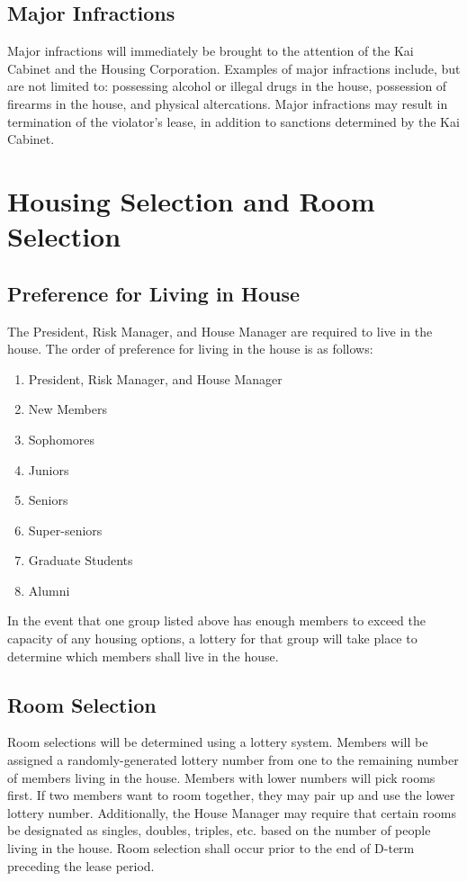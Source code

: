 \subsection{Major Infractions}

Major infractions will immediately be brought to the attention of the Kai
Cabinet and the Housing Corporation.
Examples of major infractions include, but are not limited to: possessing
alcohol or illegal drugs in the house, possession of firearms in the house, and
physical altercations.
Major infractions may result in termination of the violator’s lease, in
addition to sanctions determined by the Kai Cabinet.

\section{Housing Selection and Room Selection}

\subsection{Preference for Living in House}

The President, Risk Manager, and House Manager are required to live in the
house.
The order of preference for living in the house is as follows:
\begin{enumerate}
    \item President, Risk Manager, and House Manager
    \item New Members
    \item Sophomores
    \item Juniors
    \item Seniors
    \item Super-seniors
    \item Graduate Students
    \item Alumni
\end{enumerate}

In the event that one group listed above has enough members to exceed the
capacity of any housing options, a lottery for that group will take place to
determine which members shall live in the house.

\subsection{Room Selection}

Room selections will be determined using a lottery system.
Members will be assigned a randomly-generated lottery number from one to the
remaining number of members living in the house.
Members with lower numbers will pick rooms first.
If two members want to room together, they may pair up and use the lower
lottery number.
Additionally, the House Manager may require that certain rooms be designated as
singles, doubles, triples, etc.
based on the number of people living in the house.
Room selection shall occur prior to the end of D-term preceding the lease
period.

